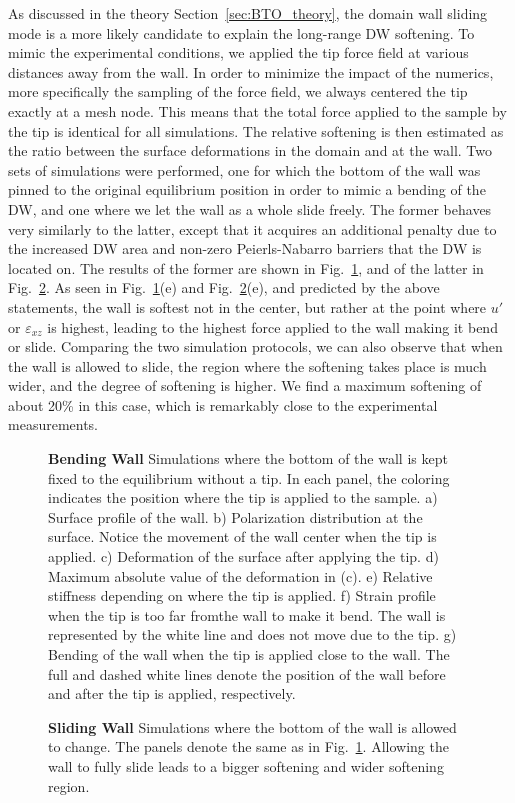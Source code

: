 As discussed in the theory Section~\ref{sec:BTO_theory}, the domain wall sliding mode is a more likely candidate to explain the long-range \gls{DW} softening.
To mimic the experimental conditions, we applied the tip force field at various distances away from the wall.
In order to minimize the impact of the numerics, more specifically the sampling of the force field, we always centered the tip exactly at a mesh node.
This means that the total force applied to the sample by the tip is identical for all simulations.
The relative softening is then estimated as the ratio between the surface deformations in the domain and at the wall.
Two sets of simulations were performed, one for which the bottom of the wall was pinned to the original equilibrium position in order to mimic a bending of the \gls{DW}, and one where we let the wall as a whole slide freely.
The former behaves very similarly to the latter, except that it acquires an additional penalty due to the increased \gls{DW} area and non-zero Peierls-Nabarro barriers that the \gls{DW} is located on.
The results of the former are shown in Fig.~\ref{fig:BTO_bending_sim}, and of the latter in Fig.~\ref{fig:BTO_sliding_sim}.
As seen in Fig.~\ref{fig:BTO_bending_sim}(e) and Fig.~\ref{fig:BTO_sliding_sim}(e), and predicted by the above statements, the wall is softest not in the center, but rather at the point where $u'$ or $\varepsilon_{xz}$ is highest, leading to the highest force applied to the wall making it bend or slide.
Comparing the two simulation protocols, we can also observe that when the wall is allowed to slide, the region where the softening takes place is much wider, and the degree of softening is higher.
We find a maximum softening of about 20\% in this case, which is remarkably close to the experimental measurements.
\begin{figure}
	\caption{\label{fig:BTO_bending_sim}{\bf Bending Wall} Simulations where the bottom of the wall is kept fixed to the equilibrium without a tip. In each panel, the coloring indicates the position where the tip is applied to the sample. a) Surface profile of the wall. b) Polarization distribution at the surface. Notice the movement of the wall center when the tip is applied. c) Deformation of the surface after applying the tip. d) Maximum absolute value of the deformation in (c). e) Relative stiffness depending on where the tip is applied. f) Strain profile when the tip is too far fromthe  wall to make it bend. The wall is represented by the white line and does not move due to the tip. g) Bending of the wall when the tip is applied close to the wall. The full and dashed white lines denote the position of the wall before and after the tip is applied, respectively.}
\end{figure}
\begin{figure}
	\caption{\label{fig:BTO_sliding_sim}{\bf Sliding Wall} Simulations where the bottom of the wall is allowed to change. The panels denote the same as in Fig.~\ref{fig:BTO_bending_sim}. Allowing the wall to fully slide leads to a bigger softening and wider softening region.}
\end{figure}


